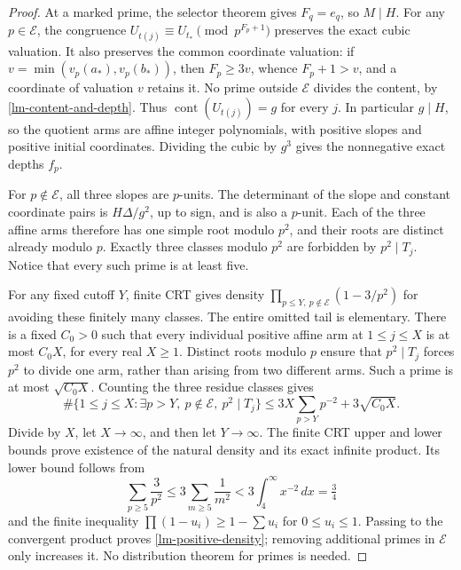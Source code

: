 \begin{proof}
At a marked prime, the selector theorem gives \(F_q=e_q\), so
\(M\mid H\). For any \(p\in\mathcal E\), the congruence
\(U_{t(j)}\equiv U_{t_*}\pmod {p^{F_p+1}}\) preserves the exact
cubic valuation. It also preserves the common coordinate valuation:
if \(v=\min(v_p(a_*),v_p(b_*))\), then \(F_p\ge3v\), whence
\(F_p+1>v\), and a coordinate of valuation \(v\) retains it.
No prime outside \(\mathcal E\) divides the content, by
\eqref{lm-content-and-depth}. Thus \(\operatorname{cont}(U_{t(j)})=g\)
for every \(j\). In particular \(g\mid H\), so the quotient arms
are affine integer polynomials, with positive slopes and positive
initial coordinates. Dividing the cubic by \(g^3\) gives the
nonnegative exact depths \(f_p\).

For \(p\notin\mathcal E\), all three slopes are \(p\)-units.
The determinant of the slope and constant coordinate pairs is
\(H\Delta/g^2\), up to sign, and is also a \(p\)-unit. Each
of the three affine arms therefore has one simple root modulo
\(p^2\), and their roots are distinct already modulo \(p\).
Exactly three classes modulo \(p^2\) are forbidden by
\(p^2\mid T_j\). Notice that every such prime is at least five.

For any fixed cutoff \(Y\), finite CRT gives density
\(\prod_{p\le Y,\ p\notin\mathcal E}(1-3/p^2)\) for avoiding
these finitely many classes. The entire omitted tail is elementary.
There is a fixed \(C_0>0\) such that every individual positive
affine arm at \(1\le j\le X\) is at most \(C_0X\), for every
real \(X\ge1\). Distinct roots modulo \(p\) ensure that
\(p^2\mid T_j\) forces \(p^2\) to divide one arm, rather than
arising from two different arms. Such a prime is at most
\(\sqrt{C_0X}\). Counting the three residue classes gives
\begin{equation}
 \#\{1\le j\le X:\exists p>Y,\ p\notin\mathcal E,
                         \ p^2\mid T_j\}
 \le3X\sum_{p>Y}p^{-2}+3\sqrt{C_0X}.
 \label{lm-complete-square-tail}
\end{equation}
Divide by \(X\), let \(X\to\infty\), and then let \(Y\to\infty\).
The finite CRT upper and lower bounds prove existence of the natural
density and its exact infinite product. Its lower bound follows from
\[
 \sum_{p\ge5}\frac3{p^2}
 \le3\sum_{m\ge5}\frac1{m^2}
 <3\int_4^\infty x^{-2}\,dx=\tfrac34
\]
and the finite inequality \(\prod(1-u_i)\ge1-\sum u_i\) for
\(0\le u_i\le1\). Passing to the convergent product proves
\eqref{lm-positive-density}; removing additional primes in
\(\mathcal E\) only increases it. No distribution theorem for
primes is needed.


\end{proof}
